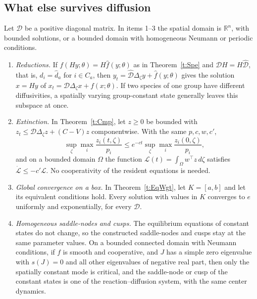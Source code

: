 \subsection{What else survives diffusion}\label{s:spaSur}
Let $\mathcal D$ be a positive diagonal matrix. In items 1--3 the spatial domain is $\mathbb R^n$, with bounded solutions, or a bounded domain with homogeneous Neumann or periodic conditions.
\begin{enumerate}
\item \emph{Reductions.} If $f(Hy;\theta)=H\widehat f(y;\theta)$ as in Theorem~\ref{t:Spe} and $\mathcal DH=H\widehat{\mathcal D}$, that is, $d_i=\widehat d_a$ for $i\in C_a$, then $y_t=\widehat{\mathcal D}\Delta_\zeta y+\widehat f(y;\theta)$ gives the solution $x=Hy$ of $x_t=\mathcal D\Delta_\zeta x+f(x;\theta)$. If two species of one group have different diffusivities, a spatially varying group-constant state generally leaves this subspace at once.
\item \emph{Extinction.} In Theorem~\ref{t:Cmp}, let $z\ge0$ be bounded with $z_t\le\mathcal D\Delta_\zeta z+(C-V)z$ componentwise. With the same $p,c,w,c'$,
\[
 \sup_\zeta\max_i\frac{z_i(t,\zeta)}{p_i}\le e^{-ct}\sup_\zeta\max_i\frac{z_i(0,\zeta)}{p_i},
\]
and on a bounded domain $\Omega$ the function $\mathcal L(t)=\int_\Omega w^\top z\,d\zeta$ satisfies $\dot{\mathcal L}\le-c'\mathcal L$. No cooperativity of the resident equations is needed.
\item \emph{Global convergence on a box.} In Theorem~\ref{t:EqWgt}, let $K=[a,b]$ and let its equivalent conditions hold. Every solution with values in $K$ converges to $e$ uniformly and exponentially, for every $\mathcal D$.
\item \emph{Homogeneous saddle-nodes and cusps.} The equilibrium equations of constant states do not change, so the constructed saddle-nodes and cusps stay at the same parameter values. On a bounded connected domain with Neumann conditions, if $f$ is smooth and cooperative, and $J$ has a simple zero eigenvalue with $s(J)=0$ and all other eigenvalues of negative real part, then only the spatially constant mode is critical, and the saddle-node or cusp of the constant states is one of the reaction--diffusion system, with the same center dynamics.
\end{enumerate}
\eeC
